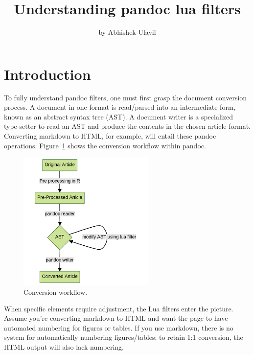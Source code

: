\title{Understanding pandoc lua filters}
\author{by Abhishek Ulayil}

\maketitle


\section{Introduction}
To fully understand pandoc filters, one must first grasp the document conversion process. A document in one format is read/parsed into an intermediate form, known as an abstract syntax tree (AST). A document writer is a specialized type-setter to read an AST and produce the contents in the chosen article format. Converting markdown to HTML, for example, will entail these pandoc operations. Figure~\ref{fig:workflow} shows the conversion workflow within pandoc.

\begin{figure}[htbp]
  \centering
  \includegraphics[width=0.6\textwidth]{figures/workflow.png}
  \caption{Conversion workflow.}
  \label{fig:workflow}
\end{figure}

When specific elements require adjustment, the Lua filters enter the picture. Assume you're converting markdown to HTML and want the page to have automated numbering for figures or tables. 
If you use markdown, there is no system for automatically numbering figures/tables; to retain 1:1 conversion, the HTML output will also lack numbering. 

